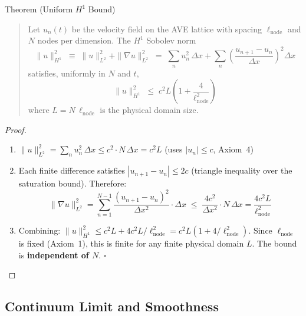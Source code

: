 \begin{resultbox}{Theorem (Uniform $H^1$ Bound)}
\begin{quote}
    Let $u_n(t)$ be the velocity field on the AVE lattice with spacing
    $\ell_\mathrm{node}$ and $N$ nodes per dimension.  The $H^1$ Sobolev
    norm
    \begin{equation}
        \|u\|_{H^1}^2 \;\equiv\; \|u\|_{L^2}^2 + \|\nabla u\|_{L^2}^2
        \;=\; \sum_n u_n^2\,\Delta x
        + \sum_n \!\left(\frac{u_{n+1}-u_n}{\Delta x}\right)^{\!2}\!\Delta x
    \end{equation}
    satisfies, uniformly in $N$ and $t$,
    \begin{equation}
        \|u\|_{H^1}^2 \;\leq\; c^2 L \left(1 + \frac{4}{\ell_\mathrm{node}^2}\right)
        \label{eq:h1_bound}
    \end{equation}
    where $L = N\,\ell_\mathrm{node}$ is the physical domain size.
\end{quote}
\end{resultbox}

\begin{proof}
\begin{enumerate}
    \item $\|u\|_{L^2}^2 = \sum_n u_n^2 \,\Delta x \leq c^2 \cdot N\,\Delta x = c^2 L$
          \hfill (uses $|u_n| \leq c$, Axiom~4)

    \item Each finite difference satisfies $|u_{n+1} - u_n| \leq 2c$ (triangle
          inequality over the saturation bound).  Therefore:
          \begin{equation}
              \|\nabla u\|_{L^2}^2
              = \sum_{n=1}^{N-1} \frac{(u_{n+1}-u_n)^2}{\Delta x^2}\cdot\Delta x
              \;\leq\; \frac{4c^2}{\Delta x^2} \cdot N\,\Delta x
              = \frac{4c^2 L}{\ell_\mathrm{node}^2}
          \end{equation}

    \item Combining: $\|u\|_{H^1}^2 \leq c^2L + 4c^2L/\ell_\mathrm{node}^2
          = c^2L(1 + 4/\ell_\mathrm{node}^2)$.  Since $\ell_\mathrm{node}$ is
          fixed (Axiom~1), this is finite for any finite physical domain $L$.
          The bound is \textbf{independent of $N$}. \qquad\qquad $\square$
\end{enumerate}
\end{proof}

\subsection{Continuum Limit and Smoothness}

